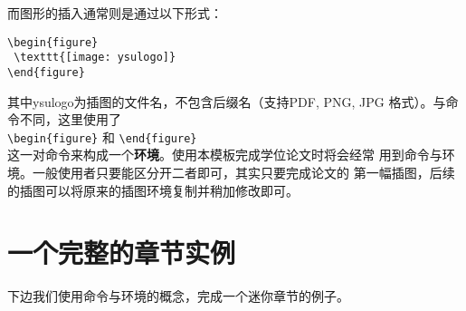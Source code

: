 而图形的插入通常则是通过以下形式：
\begin{verbatim}
\begin{figure}
 \texttt{[image: ysulogo]}
\end{figure}
\end{verbatim}
其中ysulogo为插图的文件名，不包含后缀名（\XeLaTeX 支持PDF, PNG, JPG 格式）。与命令不同，这里使用了\\
\verb|\begin{figure}|
和
\verb|\end{figure}|\\
这一对命令来构成一个\textbf{环境}。使用本模板完成学位论文时将会经常
用到命令与环境。一般使用者只要能区分开二者即可，其实只要完成论文的
第一幅插图，后续的插图可以将原来的插图环境复制并稍加修改即可。

\section{一个完整的章节实例}
下边我们使用命令与环境的概念，完成一个迷你章节的例子。

